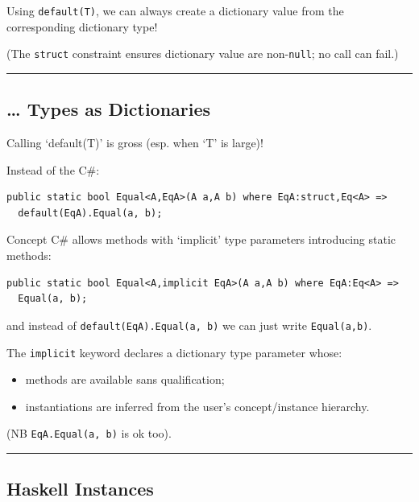 Using \lstinline!default(T)!, we can always create a dictionary value
from the corresponding dictionary type!

(The \lstinline!struct! constraint ensures dictionary value are
non-\lstinline!null!; no call can fail.)

\begin{center}\rule{0.5\linewidth}{\linethickness}\end{center}

\subsection{\ldots{} Types as
Dictionaries}\label{types-as-dictionaries-1}

Calling `default(T)' is gross (esp. when `T' is large)!

Instead of the C\#:

\begin{lstlisting}
public static bool Equal<A,EqA>(A a,A b) where EqA:struct,Eq<A> =>
  default(EqA).Equal(a, b);
\end{lstlisting}

Concept C\# allows methods with `implicit' type parameters introducing
static methods:

\begin{lstlisting}
public static bool Equal<A,implicit EqA>(A a,A b) where EqA:Eq<A> =>
  Equal(a, b); 
\end{lstlisting}

and instead of \lstinline!default(EqA).Equal(a, b)! we can just write
\lstinline!Equal(a,b)!.

The \lstinline!implicit! keyword declares a dictionary type parameter
whose:

\begin{itemize}
\tightlist
\item
  methods are available sans qualification;
\item
  instantiations are inferred from the user's concept/instance
  hierarchy.
\end{itemize}

(NB \lstinline!EqA.Equal(a, b)! is ok too).

\begin{center}\rule{0.5\linewidth}{\linethickness}\end{center}

\subsection{Haskell Instances}\label{haskell-instances}


